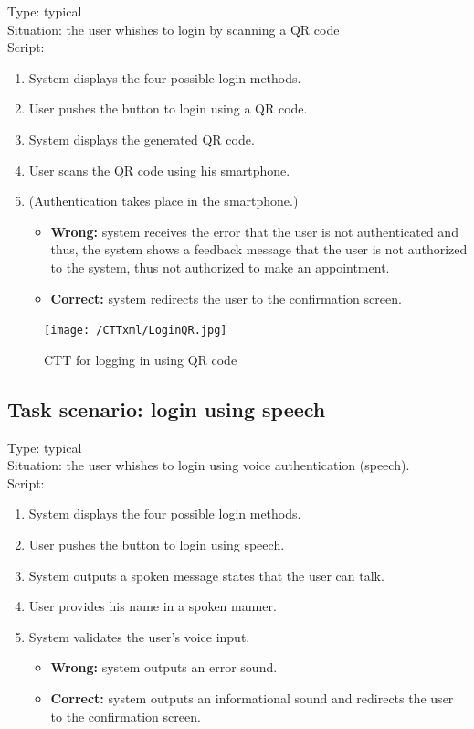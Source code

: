 \documentclass[11pt, a4paper,svglistings]{report}
\begin{document}
Type: typical \\
Situation: the user whishes to login by scanning a QR code \\
Script:
\begin{enumerate}
\item System displays the four possible login methods.
\item User pushes the button to login using a QR code.
\item System displays the generated QR code.
\item User scans the QR code using his smartphone.
\item (Authentication takes place in the smartphone.)
\begin{itemize}
\item \textbf{Wrong:} system receives the error that the user is not authenticated and thus, the system shows a feedback message that the user is not authorized to the system, thus not authorized to make an appointment.
\item \textbf{Correct:} system redirects the user to the confirmation screen.
\end{itemize}
\end{enumerate}

\begin{figure}[H]
\centering
    \texttt{[image: /CTTxml/LoginQR.jpg]}
  \caption[QR code login CTT]{CTT for logging in using QR code}
\end{figure}


\subsection{\label{subsec:loginSpeech}Task scenario: login using speech}

Type: typical \\
Situation: the user whishes to login using voice authentication (speech). \\
Script:
\begin{enumerate}
\item System displays the four possible login methods.
\item User pushes the button to login using speech.
\item System outputs a spoken message states that the user can talk.
\item User provides his name in a spoken manner.
\item System validates the user's voice input.
\begin{itemize}
\item \textbf{Wrong:} system outputs an error sound.
\item \textbf{Correct:} system outputs an informational sound and redirects the user to the  confirmation screen.
\end{itemize}
\end{enumerate}
\end{document}
